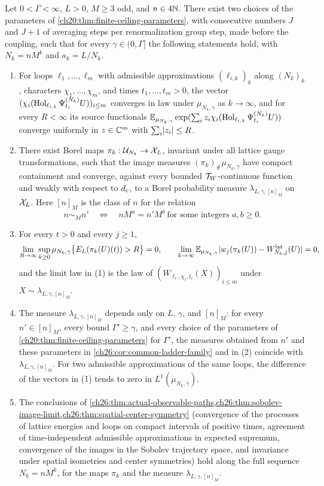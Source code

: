 \begin{theorem}\label{ch26:thm:full-M-ladder}
Let $0<\Gamma<\infty$, $L>0$, $M\ge3$ odd, and $n\in4\mathbb N$. There exist two choices of the parameters of \cref{ch20:thm:finite-ceiling-parameters}, with consecutive numbers $J$ and $J+1$ of averaging steps per renormalization group step, made before the coupling, such that for every $\gamma\in(0,\Gamma]$ the following statements hold, with $N_k=nM^k$ and $a_k=L/N_k$.
\begin{enumerate}
\item For loops $\ell_1,\dots,\ell_m$ with admissible approximations $(\ell_{i,k})_k$ along $(N_k)_k$, characters $\chi_1,\dots,\chi_m$, and times $t_1,\dots,t_m>0$, the vector $(\chi_i(\operatorname{Hol}_{\ell_{i,k}}\Psi^{(N_k)}_{t_i}U))_{i\le m}$ converges in law under $\mu_{N_k,\gamma}$ as $k\to\infty$, and for every $R<\infty$ its source functionals $\mathbb E_{\mu_{N_k,\gamma}}\exp(\sum_iz_i\chi_i(\operatorname{Hol}_{\ell_{i,k}}\Psi^{(N_k)}_{t_i}U))$ converge uniformly in $z\in\mathbb C^m$ with $\sum_i\lvert z_i\rvert\le R$.
\item There exist Borel maps $\pi_k:\mathcal U_{N_k}\to\mathcal X_L$, invariant under all lattice gauge transformations, such that the image measures $(\pi_k)_\#\mu_{N_k,\gamma}$ have compact containment and converge, against every bounded $\mathcal T_W$-continuous function and weakly with respect to $d_c$, to a Borel probability measure $\lambda_{L,\gamma,[n]_M}$ on $\mathcal X_L$. Here $[n]_M$ is the class of $n$ for the relation
\[
 n\sim_Mn'\quad\Longleftrightarrow\quad nM^a=n'M^b\ \text{for some integers }a,b\ge0 .
\]
\item For every $t>0$ and every $j\ge1$,
\[
 \lim_{R\to\infty}\sup_{k\ge0}\mu_{N_k,\gamma}\bigl\{E_L(\pi_k(U)(t))>R\bigr\}=0,\qquad \lim_{k\to\infty}\mathbb E_{\mu_{N_k,\gamma}}\lvert w_j(\pi_k(U))-W^{\mathrm{lat}}_{N_k,j}(U)\rvert=0,
\]
and the limit law in (1) is the law of $(W_{\ell_i,\chi_i,t_i}(X))_{i\le m}$ under $X\sim\lambda_{L,\gamma,[n]_M}$.
\item The measure $\lambda_{L,\gamma,[n]_M}$ depends only on $L$, $\gamma$, and $[n]_M$: for every $n'\in[n]_M$, every bound $\Gamma'\ge\gamma$, and every choice of the parameters of \cref{ch20:thm:finite-ceiling-parameters} for $\Gamma'$, the measures obtained from $n'$ and these parameters in \cref{ch26:cor:common-ladder-family} and in (2) coincide with $\lambda_{L,\gamma,[n]_M}$. For two admissible approximations of the same loops, the difference of the vectors in (1) tends to zero in $L^1(\mu_{N_k,\gamma})$.
\item The conclusions of \cref{ch26:thm:actual-observable-paths,ch26:thm:sobolev-image-limit,ch26:thm:spatial-center-symmetry} (convergence of the processes of lattice energies and loops on compact intervals of positive times, agreement of time-independent admissible approximations in expected supremum, convergence of the images in the Sobolev trajectory space, and invariance under spatial isometries and center symmetries) hold along the full sequence $N_k=nM^k$, for the maps $\pi_k$ and the measure $\lambda_{L,\gamma,[n]_M}$.
\end{enumerate}
\end{theorem}

